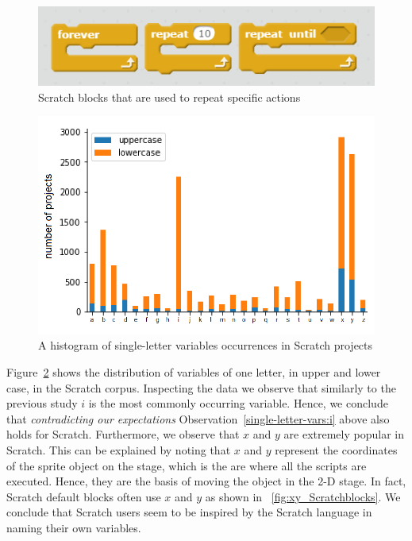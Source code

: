 \documentclass[conference]{IEEEtran}
\begin{document}
\begin{figure}[h]
	\begin{center}
		\includegraphics[width=\columnwidth]{fig/loops_in_Scratch}
		\caption{Scratch blocks that are used to repeat specific actions}
		\label{fig:loop_Scratchblocks}
	\end{center}
\end{figure} 

\begin{figure}[h]
	\begin{center}
		\includegraphics[width=\columnwidth]{fig/project/varname_singleletter-project}
		\caption{A histogram of single-letter variables occurrences in Scratch projects }
		\label{fig:one_letter_occurrence}
	\end{center}
\end{figure} 
Figure~\ref{fig:one_letter_occurrence} shows the distribution of variables of one letter, in upper and lower case, in the Scratch corpus. 
Inspecting the data we observe that similarly to the previous study $i$ is the most commonly occurring variable. 
Hence, we conclude that \emph{contradicting our expectations} Observation~\ref{single-letter-vars:i} above also holds for Scratch.
Furthermore, we observe that $x$ and $y$ are extremely popular in Scratch. 
This can be explained by noting that $x$ and $y$ represent the coordinates of the sprite object on the stage, which is the are where all the scripts are executed. 
Hence, they are the basis of moving the object in the 2-D stage. 
In fact, Scratch default blocks often use $x$ and $y$ as shown in \figurename{~\ref{fig:xy_Scratchblocks}}. 
We conclude that Scratch users seem to be inspired by the Scratch language in naming their own variables. 
\end{document}
